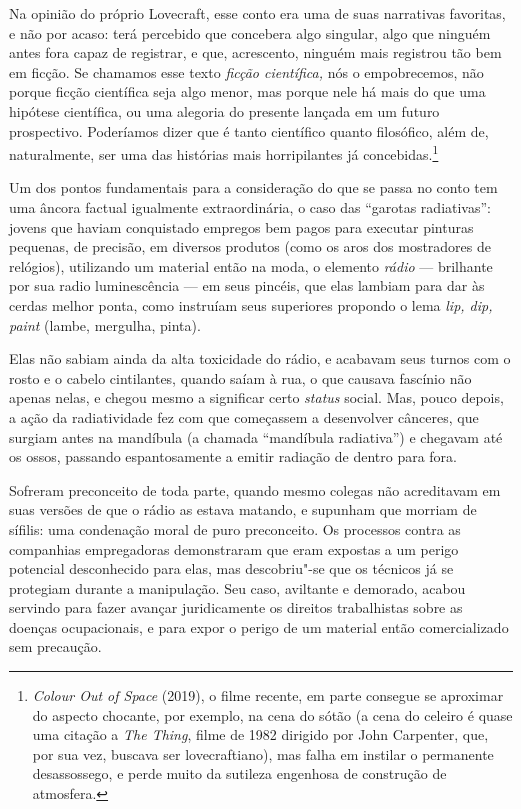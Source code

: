 Na opinião do próprio Lovecraft, esse conto era uma de suas narrativas
favoritas, e não por acaso: terá percebido que concebera algo singular,
algo que ninguém antes fora capaz de registrar, e que, acrescento,
ninguém mais registrou tão bem em ficção. Se chamamos esse texto
\emph{ficção científica,} nós o empobrecemos, não porque ficção
científica seja algo menor, mas porque nele há mais do que uma hipótese
científica, ou uma alegoria do presente lançada em um futuro
prospectivo. Poderíamos dizer que é tanto científico quanto filosófico,
além de, naturalmente, ser uma das histórias mais horripilantes já
concebidas.\footnote{\emph{Colour Out of Space} (2019), o filme recente,
  em parte consegue se aproximar do aspecto chocante, por exemplo, na
  cena do sótão (a cena do celeiro é quase uma citação a \emph{The
  Thing}, filme de 1982 dirigido por John Carpenter, que, por sua vez,
  buscava ser lovecraftiano), mas falha em instilar o permanente
  desassossego, e perde muito da sutileza engenhosa de construção de
  atmosfera.}

Um dos pontos fundamentais para a consideração do que se passa no conto
tem uma âncora factual igualmente extraordinária, o caso das ``garotas
radiativas'': jovens que haviam conquistado empregos bem pagos para
executar pinturas pequenas, de precisão, em diversos produtos (como os
aros dos mostradores de relógios), utilizando um material então na moda,
o elemento \emph{rádio} --- brilhante por sua radio luminescência --- em
seus pincéis, que elas lambiam para dar às cerdas melhor ponta, como
instruíam seus superiores propondo o lema \emph{lip, dip, paint} (lambe,
mergulha, pinta).

Elas não sabiam ainda da alta toxicidade do rádio, e acabavam seus
turnos com o rosto e o cabelo cintilantes, quando saíam à rua, o que
causava fascínio não apenas nelas, e chegou mesmo a significar certo
\emph{status} social. Mas, pouco depois, a ação da radiatividade fez com
que começassem a desenvolver cânceres, que surgiam antes na mandíbula (a
chamada ``mandíbula radiativa'') e chegavam até os ossos, passando
espantosamente a emitir radiação de dentro para fora.

Sofreram preconceito de toda parte, quando mesmo colegas não acreditavam
em suas versões de que o rádio as estava matando, e supunham que morriam
de sífilis: uma condenação moral de puro preconceito. Os processos
contra as companhias empregadoras demonstraram que eram expostas a um
perigo potencial desconhecido para elas, mas descobriu"-se que os
técnicos já se protegiam durante a manipulação. Seu caso, aviltante e
demorado, acabou servindo para fazer avançar juridicamente os direitos
trabalhistas sobre as doenças ocupacionais, e para expor o perigo de um
material então comercializado sem precaução.

